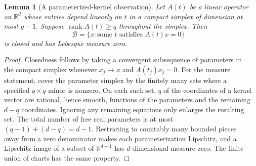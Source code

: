 \documentclass[11pt]{article}
\newtheorem{lemma}[theorem]{Lemma}
\newcommand{\R}{\mathbb R}
\begin{document}
\begin{lemma}[A parameterized-kernel observation]\label{kernels}
Let $A(t)$ be a linear operator on $\R^d$ whose entries depend linearly
on $t$ in a compact simplex of dimension at most $q-1$. Suppose
$\operatorname{rank}A(t)\ge q$ throughout the simplex. Then
\[
 \mathcal B=\{x:\text{some }t\text{ satisfies }A(t)x=0\}
\]
is closed and has Lebesgue measure zero.
\end{lemma}
\begin{proof}
Closedness follows by taking a convergent subsequence of parameters
in the compact simplex whenever $x_j\to x$ and $A(t_j)x_j=0$.
For the measure statement, cover the parameter simplex by the finitely
many sets where a specified $q\times q$ minor is nonzero. On each such
set, $q$ of the coordinates of a kernel vector are rational, hence smooth,
functions of the parameters and the remaining $d-q$ coordinates.
Ignoring any remaining equations only enlarges the resulting set.
The total number of free real parameters is at most
$(q-1)+(d-q)=d-1$. Restricting to countably many bounded pieces away
from a zero denominator makes each parameterization Lipschitz, and a
Lipschitz image of a subset of $\R^{d-1}$ has $d$-dimensional measure
zero. The finite union of charts has the same property.
\end{proof}
\end{document}
